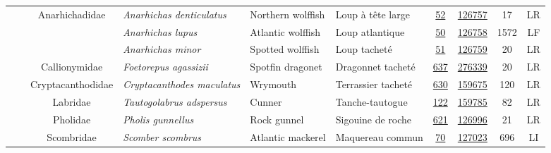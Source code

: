 \documentclass[12pt]{article}\usepackage[]{graphicx}\usepackage[]{color}
\begin{document}
\begin{landscapepage}
\begin{longtable}[t]{ccc>{\centering\arraybackslash}p{3cm}>{\centering\arraybackslash}p{3cm}>{\centering\arraybackslash}p{3cm}>{}c>{}ccc}
\hspace{1em}\hspace{1em} &  & Anarhichadidae & \em{Anarhichas denticulatus} & Northern wolffish & Loup à tête large & \href{#sec:52}{52} & \href{http://www.marinespecies.org/aphia.php?p=taxdetails&id=126757}{126757} & 17 & LR\\
\hspace{1em}\hspace{1em} &  &  & \em{Anarhichas lupus} & Atlantic wolffish & Loup atlantique & \href{#sec:50}{50} & \href{http://www.marinespecies.org/aphia.php?p=taxdetails&id=126758}{126758} & 1572 & LF\\
\hspace{1em}\hspace{1em} &  &  & \em{Anarhichas minor} & Spotted wolffish & Loup tacheté & \href{#sec:51}{51} & \href{http://www.marinespecies.org/aphia.php?p=taxdetails&id=126759}{126759} & 20 & LR\\
\hspace{1em}\hspace{1em} &  & Callionymidae & \em{Foetorepus agassizii} & Spotfin dragonet & Dragonnet tacheté & \href{#sec:637}{637} & \href{http://www.marinespecies.org/aphia.php?p=taxdetails&id=276339}{276339} & 20 & LR\\
\hspace{1em}\hspace{1em} &  & Cryptacanthodidae & \em{Cryptacanthodes maculatus} & Wrymouth & Terrassier tacheté & \href{#sec:630}{630} & \href{http://www.marinespecies.org/aphia.php?p=taxdetails&id=159675}{159675} & 120 & LR\\
\hspace{1em}\hspace{1em} &  & Labridae & \em{Tautogolabrus adspersus} & Cunner & Tanche-tautogue & \href{#sec:122}{122} & \href{http://www.marinespecies.org/aphia.php?p=taxdetails&id=159785}{159785} & 82 & LR\\
\hspace{1em}\hspace{1em} &  & Pholidae & \em{Pholis gunnellus} & Rock gunnel & Sigouine de roche & \href{#sec:621}{621} & \href{http://www.marinespecies.org/aphia.php?p=taxdetails&id=126996}{126996} & 21 & LR\\
\hspace{1em}\hspace{1em} &  & Scombridae & \em{Scomber scombrus} & Atlantic mackerel & Maquereau commun & \href{#sec:70}{70} & \href{http://www.marinespecies.org/aphia.php?p=taxdetails&id=127023}{127023} & 696 & LI\\

\end{longtable}
\end{landscapepage}
\end{document}
